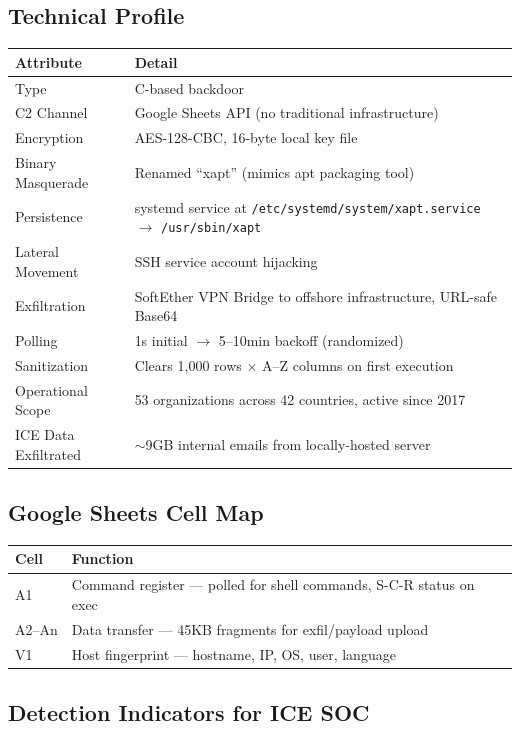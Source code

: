 \documentclass[11pt,a4paper]{article}
\begin{document}
\subsection{Technical Profile}

\begin{tabularx}{\textwidth}{lX}
\toprule
\textbf{Attribute} & \textbf{Detail} \\
\midrule
Type & C-based backdoor \\
C2 Channel & Google Sheets API (no traditional infrastructure) \\
Encryption & AES-128-CBC, 16-byte local key file \\
Binary Masquerade & Renamed ``xapt'' (mimics apt packaging tool) \\
Persistence & systemd service at \texttt{/etc/systemd/system/xapt.service} $\rightarrow$ \texttt{/usr/sbin/xapt} \\
Lateral Movement & SSH service account hijacking \\
Exfiltration & SoftEther VPN Bridge to offshore infrastructure, URL-safe Base64 \\
Polling & 1s initial $\rightarrow$ 5--10min backoff (randomized) \\
Sanitization & Clears 1,000 rows $\times$ A--Z columns on first execution \\
Operational Scope & 53 organizations across 42 countries, active since 2017 \\
ICE Data Exfiltrated & $\sim$9GB internal emails from locally-hosted server \\
\bottomrule
\end{tabularx}

\subsection{Google Sheets Cell Map}

\begin{tabularx}{\textwidth}{lX}
\toprule
\textbf{Cell} & \textbf{Function} \\
\midrule
A1 & Command register — polled for shell commands, S-C-R status on exec \\
A2--An & Data transfer — 45KB fragments for exfil/payload upload \\
V1 & Host fingerprint — hostname, IP, OS, user, language \\
\bottomrule
\end{tabularx}

\subsection{Detection Indicators for ICE SOC}
\end{document}
